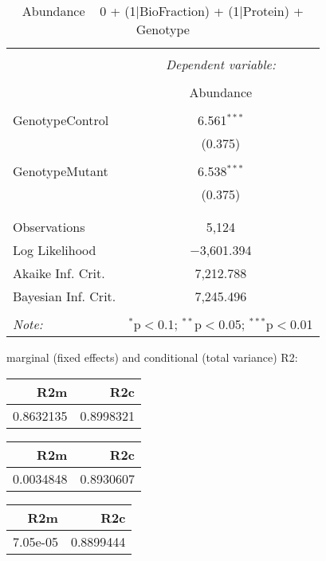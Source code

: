 \documentclass[11pt]{report}
\begin{document}
\begin{table}[!htbp] \centering 
  \caption{Abundance ~ 0 + (1|BioFraction) + (1|Protein) + Genotype} 
  \label{} 
\begin{tabular}{@{\extracolsep{5pt}}lc} 
\\[-1.8ex]\hline 
\hline \\[-1.8ex] 
 & \multicolumn{1}{c}{\textit{Dependent variable:}} \\ 
\cline{2-2} 
\\[-1.8ex] & Abundance \\ 
\hline \\[-1.8ex] 
 GenotypeControl & 6.561$^{***}$ \\ 
  & (0.375) \\ 
  & \\ 
 GenotypeMutant & 6.538$^{***}$ \\ 
  & (0.375) \\ 
  & \\ 
\hline \\[-1.8ex] 
Observations & 5,124 \\ 
Log Likelihood & $-$3,601.394 \\ 
Akaike Inf. Crit. & 7,212.788 \\ 
Bayesian Inf. Crit. & 7,245.496 \\ 
\hline 
\hline \\[-1.8ex] 
\textit{Note:}  & \multicolumn{1}{r}{$^{*}$p$<$0.1; $^{**}$p$<$0.05; $^{***}$p$<$0.01} \\ 
\end{tabular} 
\end{table} 
marginal (fixed effects) and conditional (total variance) R2:

\begin{tabular}{r|r}
\hline
R2m & R2c\\
\hline
0.8632135 & 0.8998321\\
\hline
\end{tabular}

\begin{tabular}{r|r}
\hline
R2m & R2c\\
\hline
0.0034848 & 0.8930607\\
\hline
\end{tabular}

\begin{tabular}{r|r}
\hline
R2m & R2c\\
\hline
7.05e-05 & 0.8899444\\
\hline
\end{tabular}
\end{document}
